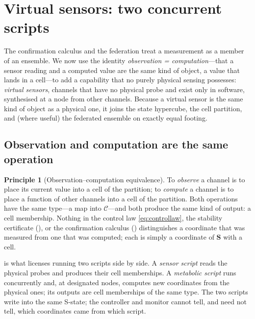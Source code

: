 \documentclass[11pt,a4paper,twocolumn]{article}
\theoremstyle{thmstyle}
\theoremstyle{definition}
\newtheorem{principle}[theorem]{Principle}
\theoremstyle{remark}
\newcommand{\Cs}{\mathcal{C}}
\newcommand{\Ss}{\mathbf{S}}
\begin{document}
\section{Virtual sensors: two concurrent scripts}
\label{sec:virtual}

The confirmation calculus and the federation treat a measurement as a
member of an ensemble. We now use the identity \emph{observation =
computation}---that a sensor reading and a computed value are the same
kind of object, a value that lands in a cell---to add a capability that no
purely physical sensing possesses: \emph{virtual sensors}, channels that
have no physical probe and exist only in software, synthesised at a node
from other channels. Because a virtual sensor is the same kind of object
as a physical one, it joins the state hypercube, the cell partition, and
(where useful) the federated ensemble on exactly equal footing.

\subsection{Observation and computation are the same operation}

\begin{principle}[Observation--computation equivalence]
\label{prin:obs-comp}
To \emph{observe} a channel is to place its current value into a cell of
the partition; to \emph{compute} a channel is to place a
function of other channels into a cell of the partition. Both operations
have the same type---a map into $\Cs$---and both produce the same kind of
output: a cell membership. Nothing in the control law
\eqref{eq:controllaw}, the stability certificate (), or the
confirmation calculus () distinguishes a coordinate
that was measured from one that was computed; each is simply a coordinate
of $\Ss$ with a cell.
\end{principle}

 is what licenses running two scripts side by side. A
\emph{sensor script} reads the physical probes and produces their cell
memberships. A \emph{metabolic script} runs concurrently and, at
designated nodes, computes new coordinates from the physical ones; its
outputs are cell memberships of the same type. The two scripts write into
the same S-state; the controller and monitor cannot tell, and need not
tell, which coordinates came from which script.
\end{document}
